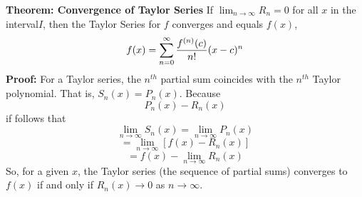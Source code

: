 \nopagenumbers
{\bf Theorem: Convergence of Taylor Series}
\vskip 6pt
If $\lim_{n\to\infty} R_n=0$ for all $x$ in the interval$I$, then the Taylor Series for $f$ converges and equals $f(x)$, $$f(x)=\sum_{n=0}^\infty{f^{(n)}(c)\over n!}(x-c)^n$$
\vskip 10pt
{\bf Proof:}
\vskip 6pt
For a Taylor series, the $n^{th}$ partial sum coincides with the $n^{th}$ Taylor polynomial. That is, $S_n(x)=P_n(x)$. Because $$P_n(x)-R_n(x)$$ if follows that
$$\lim_{n\to\infty}S_n(x)=\lim_{n\to\infty}P_n(x)$$
$$=\lim_{n\to\infty}[f(x)-R_n(x)]$$
$$=f(x)-\lim_{n\to\infty}R_n(x)$$
So, for a given $x$, the Taylor series (the sequence of partial sums) converges to $f(x)$ if and only if $R_n(x)\to 0$ as $n\to\infty$.


\vfill\eject
